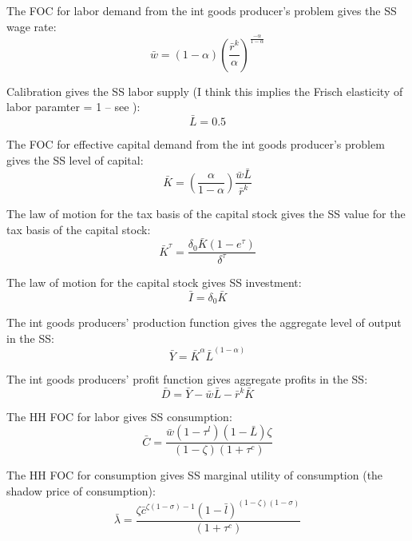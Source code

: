 \documentclass[article,11pt,letterpaper,fleqn]{article}
\theoremstyle{definition}
\numberwithin{equation}{section}
\newcommand{\cn}{\citeasnoun} %
\begin{document}
The FOC for labor demand from the int goods producer's problem gives the SS wage rate:
\begin{equation}
\bar{w} = (1-\alpha)\left(\frac{\bar{r}^{k}}{\alpha}\right)^{\frac{-\alpha}{1-\alpha}}
\end{equation}

Calibration gives the SS labor supply (I think this implies the Frisch elasticity of labor paramter = 1 -- see \cn{Zubairy2010}):
\begin{equation}
\bar{L} = 0.5
\end{equation}

The FOC for effective capital demand from the int goods producer's problem gives the SS level of capital:
\begin{equation}
\bar{K} = \left(\frac{\alpha}{1-\alpha}\right)\frac{\bar{w}\bar{L}}{\bar{r}^{k}}
\end{equation}

The law of motion for the tax basis of the capital stock gives the SS value for the tax basis of the capital stock:
\begin{equation}
\bar{K}^{\tau} = \frac{\delta_{0}\bar{K}(1-e^{\tau})}{\delta^{\tau}}
\end{equation}

The law of motion for the capital stock gives SS investment:
\begin{equation}
\bar{I} = \delta_{0}\bar{K}
\end{equation}

The int goods producers' production function gives the aggregate level of output in the SS:
\begin{equation}
\bar{Y} = \bar{K}^{\alpha}\bar{L}^{(1-\alpha)}
\end{equation}

The int goods producers' profit function gives aggregate profits in the SS:
\begin{equation}
\bar{D} = \bar{Y} - \bar{w}\bar{L} - \bar{r}^{k}\bar{K}
\end{equation}


The HH FOC for labor gives SS consumption:
\begin{equation}
\bar{C} = \frac{\bar{w}(1-\tau^{l})(1-\bar{L})\zeta}{(1-\zeta)(1+\tau^{c})}
\end{equation}

The HH FOC for consumption gives SS marginal utility of consumption (the shadow price of consumption):
\begin{equation}
\bar{\lambda} = \frac{\zeta \bar{c}^{\zeta(1-\sigma)-1}(1-\bar{l})^{(1-\zeta)(1-\sigma)}}{(1+\tau^{c})}
\end{equation}
\end{document}

